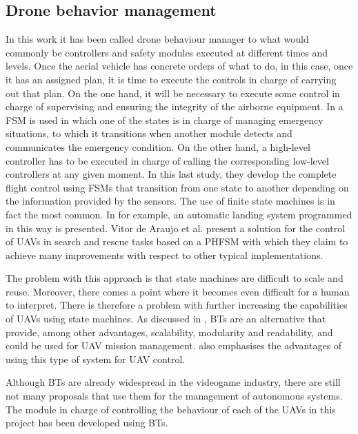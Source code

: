\subsection{Drone behavior management}
\label{subsec:DroneBehaviorManagement}
In this work it has been called drone behaviour manager to what would commonly be controllers and safety modules executed at different times and levels. Once the aerial vehicle has concrete orders of what to do, in this case, once it has an assigned plan, it is time to execute the controls in charge of carrying out that plan. On the one hand, it will be necessary to execute some control in charge of supervising and ensuring the integrity of the airborne equipment. In \cite{monterrosa2016design} a \gls{FSM} is used in which one of the states is in charge of managing emergency situations, to which it transitions when another module detects and communicates the emergency condition. On the other hand, a high-level controller has to be executed in charge of calling the corresponding low-level controllers at any given moment. In this last study, they develop the complete flight control using \glspl{FSM} that transition from one state to another depending on the information provided by the sensors. The use of finite state machines is in fact the most common. In \cite{kugler2017autoland} for example, an automatic landing system programmed in this way is presented. Vitor de Araujo et al. \cite{de2014parallel} present a solution for the control of UAVs in search and rescue tasks based on a \gls{PHFSM} with which they claim to achieve many improvements with respect to other typical implementations.

The problem with this approach is that state machines are difficult to scale and reuse. Moreover, there comes a point where it becomes even difficult for a human to interpret. There is therefore a problem with further increasing the capabilities of \glspl{UAV} using state machines. As discussed in \cite{klockner2013behavior}, \glspl{BT} are an alternative that provide, among other advantages, scalability, modularity and readability, and could be used for \gls{UAV} mission management. \cite{ogren2012increasing} also emphasises the advantages of using this type of system for \gls{UAV} control.

Although \glspl{BT} are already widespread in the videogame industry, there are still not many proposals that use them for the management of autonomous systems. The module in charge of controlling the behaviour of each of the \glspl{UAV} in this project has been developed using \glspl{BT}.

